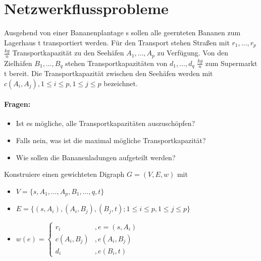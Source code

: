 \section{Netzwerkflussprobleme}
\begin{example}
Ausgehend von einer Bananenplantage s sollen alle geernteten Bananen zum Lagerhaus t transportiert werden. Für den Transport stehen Straßen mit $r_1,\ldots,r_p$ $\frac{kg}{n}$ Transportkapazität zu den Seehäfen $A_1,\ldots,A_p$ zu Verfügung. Von den Zielhäfen $B_1,\ldots,B_q$ stehen Transportkapazitäten von $d_1,\ldots,d_q$ $\frac{kg}{n}$ zum Supermarkt t bereit.
Die Transportkapazität zwischen den Seehäfen werden mit $c(A_i,A_j), 1\le i\le p, 1\le j \le p$ bezeichnet.
\paragraph{Fragen:}
\begin{itemize}
	\item Ist es mögliche, alle Transportkapazitäten auszuschöpfen?
	\item Falls nein, was ist die maximal mögliche Transportkapazität?
	\item Wie sollen die Bananenladungen aufgeteilt werden?
\end{itemize}
Konstruiere einen gewichteten Digraph $G=(V,E,w)$ mit
\begin{itemize}
	\item $V=\{s, A_1,\ldots,A_p, B_1,\ldots,q,t\} $ 
	\item $E= \{(s,A_i), (A_i,B_j), (B_j,t) ; 1\le i\le p, 1\le j\le p\} $ 
	\item $w(e)= \begin{cases}
			r_i &, e=(s,A_i) \\
			c(A_i,B_j) &, e(A_i,B_j) \\
			d_i &, e(B_i,t)
	\end{cases}$ 
\end{itemize}

\begin{center}
\begin{tikzpicture}




\end{tikzpicture}
\end{center}
\end{example}

